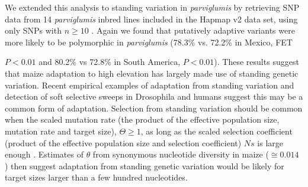 {We extended this analysis to standing variation in \emph{parviglumis} by retrieving SNP data from 14 \emph{parviglumis} inbred lines included in the Hapmap v2 data set, using only SNPs with $n\geq10$ \cite[]{Chia_2012_22660545,Hufford_2012_22660546}.  
Again we found that putatively adaptive variants were more likely to be polymorphic in \emph{parviglumis} (78.3\% vs. 72.2\% in Mexico, FET {$P < 0.01$ and 80.2\% vs 72.8\% in South America,  $P< 0.01$).  
These results suggest that maize adaptation to high elevation has largely made use of standing genetic variation. 
Recent empirical examples of adaptation from standing variation \cite[Reviewed in ][]{Barrett_2008_18006185,Messer_2013_24075201} and detection of soft selective sweeps in Drosophila \cite[]{Garud_2013_ArXiv} and humans \cite[]{Turchin_2012_22902787,Peter_2012_23071458} suggest this may be a common form of adaptation. 
Selection from standing variation should be common when the scaled mutation rate (the product of the effective population size, mutation rate and target size), $\Theta\geq1$, as long as the scaled selection coefficient (product of the effective population size and selection coefficient) $Ns$ is large enough \cite[]{Hermisson_2005_15716498}.
Estimates of $\theta$ from synonymous nucleotide diversity in maize ($\cong0.014$ \cite[\emph{e.g.,} ][]{Tenaillon_2004_15014173,Wright_2005_15919994,Ross-Ibarra_2009_19153259}) then suggest adaptation from standing genetic variation would be likely for target sizes larger than a few hundred nucleotides. 

\renewcommand{\arraystretch}{1.1}
\begin{table}[tb]


\end{table}}}
